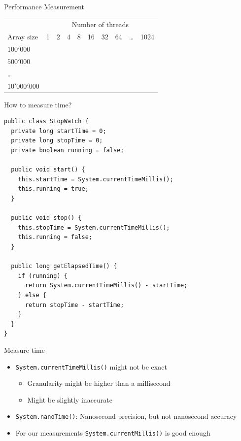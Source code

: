 \begin{frame}{Performance Measurement}
  \begin{center}
    \begin{tabular}{l||c|c|c|c|c|c|c|c|c}
      & \multicolumn{9}{c}{Number of threads} \\
      Array size & 1 & 2 & 4 & 8 & 16 & 32 & 64 & \ldots & 1024 \\\hline\hline
      $100'000$ & & & & & & & & & \\\hline
      $500'000$ & & & & & & & & & \\\hline
      \ldots & & & & & & & & & \\\hline
      $10'000'000$ & & & & & & & & & \\\hline
    \end{tabular}
  \end{center}
\end{frame}

\begin{frame}[fragile]{How to measure time?}
  \begin{lstlisting}[basicstyle=\fontsize{7}{9}\selectfont\ttfamily]
public class StopWatch {
  private long startTime = 0; 
  private long stopTime = 0;
  private boolean running = false;

  public void start() {
    this.startTime = System.currentTimeMillis();
    this.running = true;
  }
  
  public void stop() {
    this.stopTime = System.currentTimeMillis();
    this.running = false;
  }
  
  public long getElapsedTime() {
    if (running) {
      return System.currentTimeMillis() - startTime;
    } else {
      return stopTime - startTime;
    }
  }
}
  \end{lstlisting}
\end{frame}

\begin{frame}{Measure time}
  \begin{itemize}
  \item \lstinline!System.currentTimeMillis()! might not be exact
    \begin{itemize}
    \item Granularity might be higher than a millisecond
    \item Might be slightly inaccurate
    \end{itemize}
  \item \lstinline!System.nanoTime()!: Nanosecond precision, but not
    nanosecond accuracy
  \item For our measurements \lstinline!System.currentMillis()! is
    good enough
  \end{itemize}
\end{frame}


